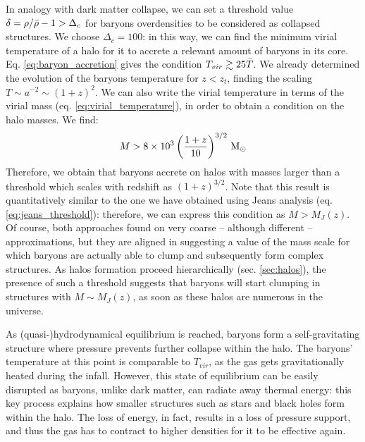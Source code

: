  In analogy with dark matter collapse, we can set a threshold value $\delta = \rho/\Bar{\rho} -1 > \Delta_c$ for baryons overdensities to be considered as collapsed structures. We choose $\Delta_c =100$: in this way, we can find the minimum virial temperature of a halo for it to accrete a relevant amount of baryons in its core. Eq. \ref{eq:baryon_accretion} gives the condition $T_{vir} \gtrsim 25 \Bar{T}$. We already determined the evolution of the baryons temperature for $z<z_t$, finding the scaling $T\sim a^{-2}\sim (1+z)^2$. We can also write the virial temperature in terms of the virial mass (eq. \ref{eq:virial_temperature}), in order to obtain a condition on the halo masses. We find:
  \begin{align}
    M > 8\times10^3 \left(\frac{1+z}{10}\right)^{3/2}\,{\rm M}_{\odot} 
  \end{align}
 Therefore, we obtain that baryons accrete on halos with masses larger than a threshold which scales with redshift as $(1+z)^{3/2}$. Note that this result is quantitatively similar to the one we have obtained using Jeans analysis (eq. \ref{eq:jeans_threshold}): therefore, we can express this condition as $M>M_J(z)$. Of course, both approaches found on very coarse -- although different -- approximations, but they are aligned in suggesting a value of the mass scale for which baryons are actually able to clump and subsequently form complex structures. As halos formation proceed hierarchically (sec. \ref{sec:halos}), the presence of such a threshold suggests that baryons will start clumping in structures with $M\sim M_J(z)$, as soon as these halos are numerous in the universe. 
 
 As (quasi-)hydrodynamical equilibrium is reached, baryons form a self-gravitating structure where pressure prevents further collapse within the halo. The baryons' temperature at this point is comparable to $T_{vir}$, as the gas gets gravitationally heated during the infall. However, this state of equilibrium can be easily disrupted as baryons, unlike dark matter, can radiate away thermal energy: this key process explains how smaller structures such as stars and black holes form within the halo. The loss of energy, in fact, results in a loss of pressure support, and thus the gas has to contract to higher densities for it to be effective again.
 
